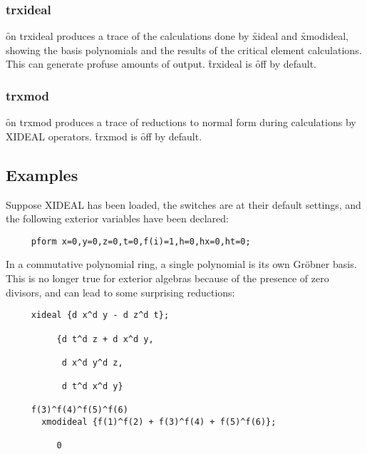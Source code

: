 \subsubsection*{trxideal}

\f{on trxideal} produces a trace of the calculations done by \f{xideal} and
\f{xmodideal}, showing the basis polynomials and the results of the
critical element calculations. This can generate profuse amounts of output.
\f{trxideal} is \f{off} by default.


\subsubsection*{trxmod}

\f{on trxmod} produces a trace of reductions to normal form during
calculations by XIDEAL operators. \f{trxmod} is \f{off} by default.




\subsection{Examples}

Suppose XIDEAL has been loaded, the switches are at their default settings,
and the following exterior variables have been declared:

\begin{verbatim}
     pform x=0,y=0,z=0,t=0,f(i)=1,h=0,hx=0,ht=0;
\end{verbatim}

In a commutative polynomial ring, a single polynomial is its own Gr{\"o}bner
basis. This is no longer true for exterior algebras because of the presence
of zero divisors, and can lead to some surprising reductions:
\begin{verbatim}
     xideal {d x^d y - d z^d t};

          {d t^d z + d x^d y,

           d x^d y^d z,

           d t^d x^d y}

     f(3)^f(4)^f(5)^f(6) 
       xmodideal {f(1)^f(2) + f(3)^f(4) + f(5)^f(6)};

          0
\end{verbatim}

